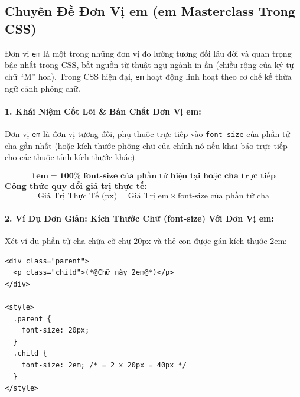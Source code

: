 \documentclass[11pt,oneside]{book}
\newcommand{\codeinline}[1]{\textcolor{accentOrange}{\texttt{#1}}}
\begin{document}
\subsection{Chuyên Đề Đơn Vị em (em Masterclass Trong CSS)}
\label{sec:css_em_masterclass}

Đơn vị \codeinline{em} là một trong những đơn vị đo lường tương đối lâu đời và quan trọng bậc nhất trong CSS, bắt nguồn từ thuật ngữ ngành in ấn (chiều rộng của ký tự chữ ``M'' hoa). Trong CSS hiện đại, \codeinline{em} hoạt động linh hoạt theo cơ chế kế thừa ngữ cảnh phông chữ.

\paragraph{1. Khái Niệm Cốt Lõi \& Bản Chất Đơn Vị em:}
Đơn vị \codeinline{em} là đơn vị tương đối, phụ thuộc trực tiếp vào \codeinline{font-size} của phần tử cha gần nhất (hoặc kích thước phông chữ của chính nó nếu khai báo trực tiếp cho các thuộc tính kích thước khác).

\begin{conceptBox}
\[
\mathbf{1\text{em} = 100\% \text{ font-size của phần tử hiện tại hoặc cha trực tiếp}}
\]
\vspace{-4pt}
\textbf{Công thức quy đổi giá trị thực tế:}
\[
\text{Giá Trị Thực Tế (px)} = \text{Giá Trị em} \times \text{font-size của phần tử cha}
\]
\end{conceptBox}

\paragraph{2. Ví Dụ Đơn Giản: Kích Thước Chữ (font-size) Với Đơn Vị em:}
Xét ví dụ phần tử cha chứa cỡ chữ $20\text{px}$ và thẻ con được gán kích thước $2\text{em}$:

\begin{codeWindow}
\begin{lstlisting}[language=HTML5]
<div class="parent">
  <p class="child">(*@Chữ này 2em@*)</p>
</div>

<style>
  .parent {
    font-size: 20px;
  }
  .child {
    font-size: 2em; /* = 2 x 20px = 40px */
  }
</style>
\end{lstlisting}
\end{codeWindow}
\end{document}
